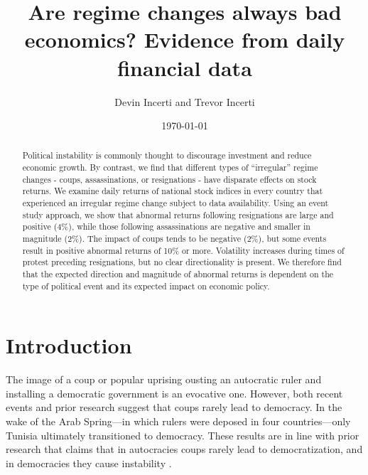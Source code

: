 \documentclass[12pt,final,fleqn]{article}
\theoremstyle{plain}
\begin{document}
\author{Devin Incerti and Trevor Incerti}
\title{\textbf{Are regime changes always bad economics? Evidence from daily financial data}}
\date{\today}
\maketitle

\singlespacing
\begin{abstract}
\noindent
Political instability is commonly thought to discourage investment and reduce economic growth. By contrast, we find that different types of ``irregular'' regime changes - coups, assassinations, or resignations - have disparate effects on stock returns. We examine daily returns of national stock indices in every country that experienced an irregular regime change subject to data availability. Using an event study approach, we show that abnormal returns following resignations are large and positive (4\%), while those following assassinations are negative and smaller in magnitude (2\%). The impact of coups tends to be negative (2\%), but some events result in positive abnormal returns of 10\% or more. Volatility increases during times of protest preceding resignations, but no clear directionality is present. We therefore find that the expected direction and magnitude of abnormal returns is dependent on the type of political event and its expected impact on economic policy. 
\end{abstract}
\doublespacing

\section{Introduction} \label{sec:Introduction}

The image of a coup or popular uprising ousting an autocratic ruler and installing a democratic government is an evocative one. However, both recent events and prior research suggest that coups rarely lead to democracy. In the wake of the Arab Spring---in which rulers were deposed in four countries---only Tunisia ultimately transitioned to democracy. These results are in line with prior research that claims that in autocracies coups rarely lead to democratization, and in democracies they cause instability \citep{derpanopoulos2015coups, marinov2014coups, powell2011global, thyne2016coup, varol2011democratic}.
\end{document}
